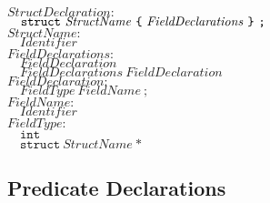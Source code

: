 \documentclass{article}
\begin{document}
\begin{flushleft}
$\mathit{StructDeclaration{:}}$\\
$\quad \mathtt{struct}\ \mathit{StructName}\ \texttt{\symbol{123}}\ \mathit{FieldDeclarations}\ \texttt{\symbol{125}}\ \texttt{;}$\\[5pt]

$\mathit{StructName{:}}$\\
$\quad \mathit{Identifier}$\\[5pt]

$\mathit{FieldDeclarations{:}}$\\
$\quad \mathit{FieldDeclaration}$\\
$\quad \mathit{FieldDeclarations}\ \mathit{FieldDeclaration}$\\[5pt]

$\mathit{FieldDeclaration{:}}$\\
$\quad \mathit{FieldType}\ \mathit{FieldName}\ \texttt{;}$\\[5pt]

$\mathit{FieldName{:}}$\\
$\quad \mathit{Identifier}$\\[5pt]

$\mathit{FieldType{:}}$\\
$\quad \texttt{int}$\\
$\quad \texttt{struct}\ \mathit{StructName}\ \texttt{*}$\\
\end{flushleft}

\subsection{Predicate Declarations}
\end{document}
